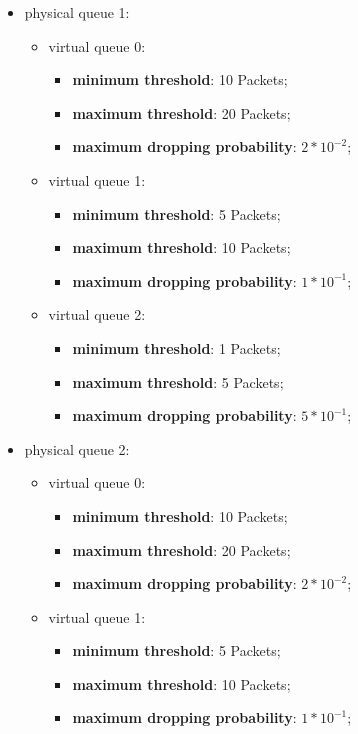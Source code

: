 \documentclass[conference,compsoc]{IEEEtran}
\begin{document}
\begin{itemize}
\begin{itemize}
    
      \item physical queue 1:
     \begin{itemize}
     	\item virtual queue 0:
     	\begin{itemize}
     		\item \textbf{minimum threshold}: 10 Packets;
		     \item \textbf{maximum threshold}: 20 Packets;
		     \item \textbf{maximum dropping probability}: $2 * 10^{-2}$;
         \end{itemize}
    	 \item virtual queue 1:
   	  \begin{itemize}
     			\item \textbf{minimum threshold}: 5 Packets;
 			    \item \textbf{maximum threshold}: 10 Packets;
   			  \item \textbf{maximum dropping probability}: $1 * 10^{-1}$;
  	   \end{itemize}
	   
	   \item virtual queue 2:
   	  \begin{itemize}
     			\item \textbf{minimum threshold}: 1 Packets;
 			    \item \textbf{maximum threshold}: 5 Packets;
   			  \item \textbf{maximum dropping probability}: $5 * 10^{-1}$;
  	   \end{itemize}   
    \end{itemize}


  \item physical queue 2:
     \begin{itemize}
     	\item virtual queue 0:
     	\begin{itemize}
     		\item \textbf{minimum threshold}: 10 Packets;
		     \item \textbf{maximum threshold}: 20 Packets;
		     \item \textbf{maximum dropping probability}: $2 * 10^{-2}$;
         \end{itemize}
    	 \item virtual queue 1:
   	  \begin{itemize}
     			\item \textbf{minimum threshold}: 5 Packets;
 			    \item \textbf{maximum threshold}: 10 Packets;
   			  \item \textbf{maximum dropping probability}: $1 * 10^{-1}$;
  	   \end{itemize}
	   

\end{itemize}
\end{itemize}
\end{itemize}
\end{document}
